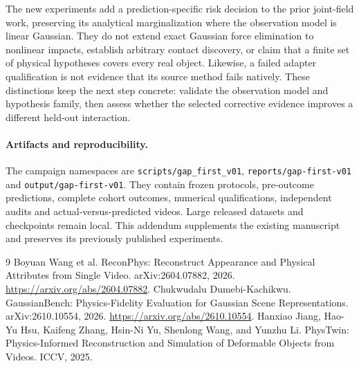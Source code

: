 \documentclass[10pt,twocolumn,letterpaper]{article}
\begin{document}
The new experiments add a prediction-specific risk decision to the prior joint-field work, preserving its analytical marginalization where the observation model is linear Gaussian. They do not extend exact Gaussian force elimination to nonlinear impacts, establish arbitrary contact discovery, or claim that a finite set of physical hypotheses covers every real object. Likewise, a failed adapter qualification is not evidence that its source method fails natively. These distinctions keep the next step concrete: validate the observation model and hypothesis family, then assess whether the selected corrective evidence improves a different held-out interaction.

\paragraph{Artifacts and reproducibility.}
The campaign namespaces are \texttt{scripts/gap\_first\_v01}, \texttt{reports/gap-first-v01} and \texttt{output/gap-first-v01}. They contain frozen protocols, pre-outcome predictions, complete cohort outcomes, numerical qualifications, independent audits and actual-versus-predicted videos. Large released datasets and checkpoints remain local. This addendum supplements the existing manuscript and preserves its previously published experiments.

\begin{thebibliography}{9}
 Boyuan Wang et al. ReconPhys: Reconstruct Appearance and Physical Attributes from Single Video. arXiv:2604.07882, 2026. \url{https://arxiv.org/abs/2604.07882}.
 Chukwudalu Dumebi-Kachikwu. GaussianBench: Physics-Fidelity Evaluation for Gaussian Scene Representations. arXiv:2610.10554, 2026. \url{https://arxiv.org/abs/2610.10554}.
 Hanxiao Jiang, Hao-Yu Hsu, Kaifeng Zhang, Hsin-Ni Yu, Shenlong Wang, and Yunzhu Li. PhysTwin: Physics-Informed Reconstruction and Simulation of Deformable Objects from Videos. ICCV, 2025.
\end{thebibliography}
\end{document}
